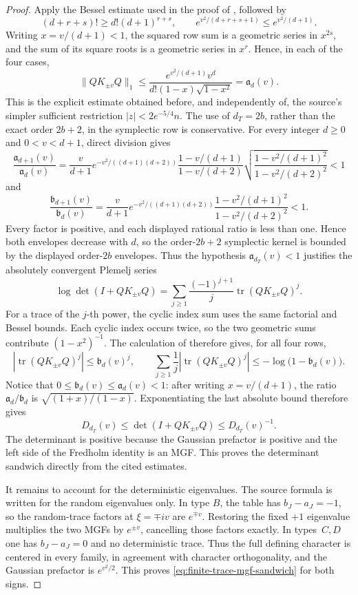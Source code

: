 \documentclass[11pt,reqno]{amsart}
\theoremstyle{plain}
\theoremstyle{definition}
\begin{document}
\begin{proof}
Apply the Bessel estimate used in the proof of
\cite[Lemma~3.6, equations~(2.16) and (3.4)]{CJL2022}, followed by
\[
 (d+r+s)!\geq d!(d+1)^{r+s},\qquad
 e^{v^2/(d+r+s+1)}\leq e^{v^2/(d+1)}.
\]
Writing \(x=v/(d+1)<1\), the squared row sum is a geometric series in
\(x^{2s}\), and the sum of its square roots is a geometric series in
\(x^r\).  Hence, in each of the four cases,
\[
 \lVert QK_{\pm v}Q\rVert_1
 \leq
 \frac{e^{v^2/(d+1)}v^d}
 {d!(1-x)\sqrt{1-x^2}}
 =\mathfrak a_d(v).
\]
This is the explicit estimate obtained before, and independently of, the
source's simpler sufficient restriction
\(\lvert z\rvert<2e^{-5/4}n\).
The use of $d_T=2b$, rather than the exact order $2b+2$, in the
symplectic row is conservative.  For every integer $d\geq0$ and
$0<v<d+1$, direct division gives
\[
 \frac{\mathfrak a_{d+1}(v)}{\mathfrak a_d(v)}
 =\frac{v}{d+1}e^{-v^2/((d+1)(d+2))}
  \frac{1-v/(d+1)}{1-v/(d+2)}
  \sqrt{\frac{1-v^2/(d+1)^2}{1-v^2/(d+2)^2}}<1
\]
and
\[
 \frac{\mathfrak b_{d+1}(v)}{\mathfrak b_d(v)}
 =\frac{v}{d+1}e^{-v^2/((d+1)(d+2))}
  \frac{1-v^2/(d+1)^2}{1-v^2/(d+2)^2}<1.
\]
Every factor is positive, and each displayed rational ratio is less than
one.  Hence both envelopes decrease with $d$, so the order-$2b+2$
symplectic kernel is bounded by the displayed order-$2b$ envelopes.
Thus the hypothesis \(\mathfrak a_{d_T}(v)<1\) justifies the absolutely
convergent Plemelj series
\[
 \log\det(I+QK_{\pm v}Q)
 =\sum_{j\geq1}\frac{(-1)^{j+1}}j
   \operatorname{tr}(QK_{\pm v}Q)^j.
\]
For a trace of the \(j\)-th power, the cyclic index sum uses the same
factorial and Bessel bounds.  Each cyclic index occurs twice, so the two
geometric sums contribute \((1-x^2)^{-1}\).  The calculation of
\cite[Lemma~3.7, equation~(3.6)]{CJL2022} therefore gives, for all four rows,
\[
 \left|\operatorname{tr}(QK_{\pm v}Q)^j\right|
 \leq\mathfrak b_d(v)^j,
 \qquad
 \sum_{j\geq1}\frac1j
  \left|\operatorname{tr}(QK_{\pm v}Q)^j\right|
 \leq-\log\bigl(1-\mathfrak b_d(v)\bigr).
\]
Notice that \(0\leq\mathfrak b_d(v)\leq\mathfrak a_d(v)<1\): after writing
\(x=v/(d+1)\), the ratio \(\mathfrak a_d/\mathfrak b_d\) is
\(\sqrt{(1+x)/(1-x)}\).  Exponentiating the last absolute bound therefore
gives
\[
 D_{d_T}(v)
 \leq\det(I+QK_{\pm v}Q)
 \leq D_{d_T}(v)^{-1}.
\]
The determinant is positive because the Gaussian prefactor is positive and
the left side of the Fredholm identity is an MGF.  This proves the determinant
sandwich directly from the cited estimates.

It remains to account for the deterministic eigenvalues.  The source formula
is written for the random eigenvalues only.  In type $B$, the table has
$b_J-a_J=-1$, so the random-trace factors at \(\xi=\mp iv\) are
$e^{\mp v}$.  Restoring the fixed $+1$ eigenvalue multiplies the two MGFs
by $e^{\pm v}$, cancelling those factors exactly.  In types~$C,D$ one has
$b_J-a_J=0$ and no deterministic trace.  Thus the full defining character
is centered in every family, in agreement with character orthogonality, and
the Gaussian prefactor is \(e^{v^2/2}\).  This proves
\eqref{eq:finite-trace-mgf-sandwich} for both signs.


\end{proof}
\end{document}

